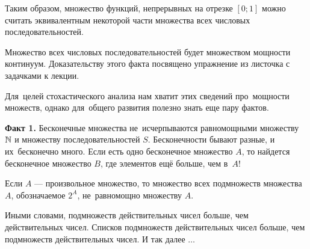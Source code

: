 \documentclass[12pt, a4paper]{article}
\begin{document}
\begin{itemize}
\begin{center}
\end{center}

Таким образом, множество функций, непрерывных на отрезке $[0;1]$ можно считать эквивалентным некоторой части множества всех числовых последовательностей.

Множество всех числовых последовательностей будет множеством мощности континуум. Доказательству этого факта посвящено упражнение из листочка с задачками к лекции.
\end{itemize}

Для~целей стохастического анализа нам хватит этих сведений про~мощности множеств, однако для~общего развития полезно знать еще пару фактов.

\textbf{Факт 1.} Бесконечные множества не~исчерпываются равномощными множеству $\mathbb N$ и множеству последовательностей $S$. Бесконечности бывают разные, и их~бесконечно много. Если есть одно бесконечное множество $A$, то найдется бесконечное множество $B$, где элементов ещё больше, чем в~$A$!

\begin{myth} Если $A$ --- произвольное множество, то множество всех подмножеств множества $A$, обозначаемое $2^{A}$, не~равномощно множеству $A$.
\end{myth}

Иными словами, подмножеств действительных чисел больше, чем действительных чисел. Списков подмножеств действительных чисел больше, чем подмножеств действительных чисел. И так далее $\dots$
\end{document}
